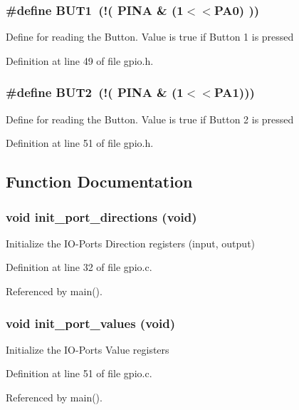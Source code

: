 \subsubsection{\setlength{\rightskip}{0pt plus 5cm}\#define BUT1~(!( PINA \& (1$<$$<$PA0) ))}\label{group__ro__gpio_g962ad4f9fe408bb50f47353836a09576}


Define for reading the Button. Value is true if Button 1 is pressed 

Definition at line 49 of file gpio.h.
\subsubsection{\setlength{\rightskip}{0pt plus 5cm}\#define BUT2~(!( PINA \& (1$<$$<$PA1)))}\label{group__ro__gpio_g2032b80cf754092d50b7b8257ed9a458}


Define for reading the Button. Value is true if Button 2 is pressed 

Definition at line 51 of file gpio.h.

\subsection{Function Documentation}
\subsubsection{\setlength{\rightskip}{0pt plus 5cm}void init\_\-port\_\-directions (void)}\label{group__ro__gpio_g6b2bee68f56638bdfcd94255e32cd367}


Initialize the IO-Ports Direction registers (input, output) 

Definition at line 32 of file gpio.c.

Referenced by main().
\subsubsection{\setlength{\rightskip}{0pt plus 5cm}void init\_\-port\_\-values (void)}\label{group__ro__gpio_ge9416d54a5ef2cd02370c4bcc8635327}


Initialize the IO-Ports Value registers 

Definition at line 51 of file gpio.c.

Referenced by main().